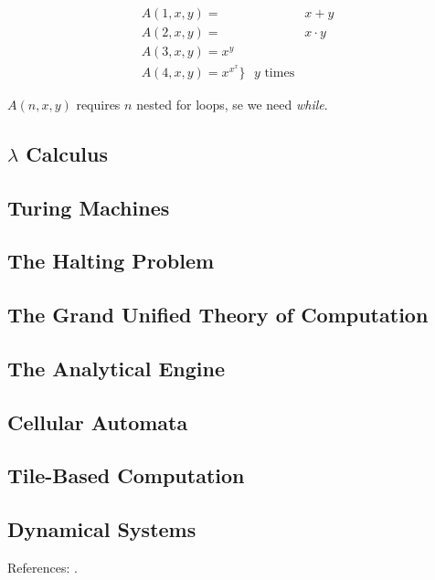 \documentclass[]{article}
\begin{document}
\begin{align*}
	A(1,x,y) =& x+y\\
	A(2,x,y) =& x \cdot y\\
	A(3,x,y) = x^y\\
	A(4,x,y) = x^{x^x} \rbrace \text{ $y$ times}
\end{align*} 

$A(n,x,y)$ requires $n$ nested for loops, se we need \emph{while}.

\subsection{$\lambda$ Calculus}
\subsection{Turing Machines}
\subsection{The Halting Problem}
\subsection{The Grand Unified Theory of Computation}
\subsection{The Analytical Engine}
\subsection{Cellular Automata}
\subsection{Tile-Based Computation}
\subsection{Dynamical Systems} 


References: \cite[Chapter 7]{moore2011nature}.



\printglossaries

 

\raggedright
{}

\end{document}
